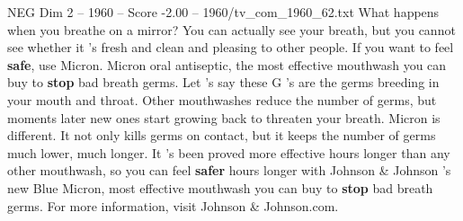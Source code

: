 \begin{textsample}{NEG Dim 2 – 1960 – Score -2.00 – 1960/tv\_com\_1960\_62.txt}  \label{ex:f2_neg_071}
What happens when you breathe on a mirror?
You can actually see your breath, but you cannot see whether it 's fresh and clean and pleasing to other people.
If you want to feel \textbf{safe}, use Micron.
Micron oral antiseptic, the most effective mouthwash you can buy to \textbf{stop} bad breath germs.
Let 's say these G 's are the germs breeding in your mouth and throat.
Other mouthwashes reduce the number of germs, but moments later new ones start growing back to threaten your breath.
Micron is different.
It not only kills germs on contact, but it keeps the number of germs much lower, much longer.
It 's been proved more effective hours longer than any other mouthwash, so you can feel \textbf{safer} hours longer with Johnson \& Johnson 's new Blue Micron, most effective mouthwash you can buy to \textbf{stop} bad breath germs.
For more information, visit Johnson \& Johnson.com.

\end{textsample}
